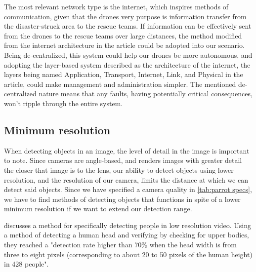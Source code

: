 \documentclass[fleqn,10pt]{wlscirep}
\newcommand{\citesup}[1]{\textsuperscript{\cite{#1}}}
\begin{document}
The most relevant network type is the internet, which inspires methods of communication, given that the drones very purpose is information transfer from the disaster-struck area to the rescue teams. If information can be effectively sent from the drones to the rescue teams over large distances, the method modified from the internet architecture in the article could be adopted into our scenario. Being de-centralized, this system could help our drones be more autonomous, and adopting the layer-based system described as the architecture of the internet, the layers being named Application, Transport, Internet, Link, and Physical in the article, could make management and administration simpler. The mentioned de-centralized nature means that any faults, having potentially critical consequences, won't ripple through the entire system.


\subsection{Minimum resolution}\label{sec:Minimum resolution}
When detecting objects in an image, the level of detail in the image is important to note. Since cameras are angle-based, and renders images with greater detail the closer that image is to the lens, our ability to detect objects using lower resolution, and the resolution of our camera, limits the distance at which we can detect said objects. Since we have specified a camera quality in \cref{tab:parrot specs}, we have to find methods of detecting objects that functions in spite of a lower minimum resolution if we want to extend our detection range.

\cite{Resolution_data} discusses a method for specifically detecting people in low resolution video. Using a method of detecting a human head and verifying by checking for upper bodies, they reached a "detection rate higher than 70\% when the head width is from three to eight pixels (corresponding to about 20 to 50 pixels of the human height) in 428 people"\citesup{Resolution_data}.
\end{document}
